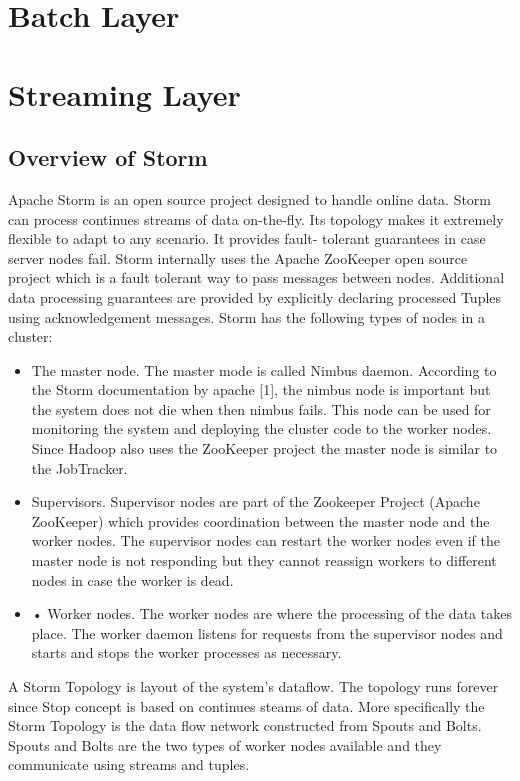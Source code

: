 \documentclass{lmproj}
\begin{document}
\section{Batch Layer}
\label{systemdescr}

\section{Streaming Layer}
\label{systemdescr}

\subsection{Overview of Storm}

Apache Storm is an open source project designed to handle online data. Storm can process continues streams of data on-the-fly.  Its topology makes it extremely flexible to adapt to any scenario. It provides fault- tolerant guarantees in case server nodes fail. Storm internally uses the Apache ZooKeeper open source project which is a fault tolerant way to pass messages between nodes. Additional data processing guarantees are provided by explicitly declaring processed Tuples using acknowledgement messages. Storm has the following types of nodes in a cluster:

\begin{itemize}
	\item The master node. The master mode is called Nimbus daemon. According to the Storm documentation by apache [1], the nimbus node is important but the system does not die when then nimbus fails. This node can be used for monitoring the system and deploying the cluster code to the worker nodes. Since Hadoop also uses the ZooKeeper project the master node is similar to the JobTracker.
	\item Supervisors. Supervisor nodes are part of the Zookeeper Project (Apache ZooKeeper) which provides coordination between the master node and the worker nodes. The supervisor nodes can restart the worker nodes even if the master node is not responding but they cannot reassign workers to different nodes in case the worker is dead.
	\item •	Worker nodes. The worker nodes are where the processing of the data takes place. The worker daemon listens for requests from the supervisor nodes and starts and stops the worker processes as necessary.
	
\end{itemize}

A Storm Topology is layout of the system’s dataflow. The topology runs forever since Stop concept is based on continues steams of data.  More specifically the Storm Topology is the data flow network constructed from Spouts and Bolts. Spouts and Bolts are the two types of worker nodes available and they communicate using streams and tuples. 
\end{document}
